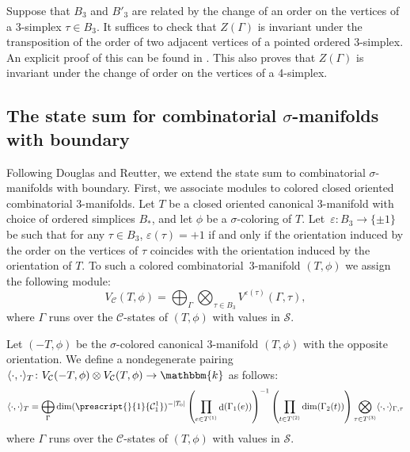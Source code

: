 \documentclass[a4paper, oneside]{amsart}
\DeclareMathOperator{\wdim}{d}
\numberwithin{equation}{subsection}
\theoremstyle{referencedlemma}
\theoremstyle{plain} %
\theoremstyle{remark}
\begin{document}
Suppose that $B_3$ and $B'_3$ are related by the change of an order on the vertices of a 3-simplex $\tau\in B_3$.  It suffices to check that $Z(\Gamma)$ is invariant under the transposition of the order of two adjacent vertices of a pointed ordered 3-simplex. An explicit proof of this can be found in \cite[Lemmas 4.2.4 and 4.2.5]{douglas_fusion_2018}. This also proves that $Z(\Gamma)$ is invariant under the change of order on the vertices of a 4-simplex. 


\subsection{The state sum for combinatorial $\sigma$-manifolds with boundary}\label{Section_State sum for manifolds with boundary} Following Douglas and Reutter, we extend the state sum to combinatorial $\sigma$-manifolds with boundary.   First, we associate modules to colored closed oriented combinatorial 3-manifolds. Let $T$ be a closed oriented canonical 3-manifold with choice of ordered simplices $B_*$, and let $\phi$ be a $\sigma$-coloring of $T$.  Let~$\varepsilon \colon
 B_3\to \{\pm 1\}$ be such that for any $\tau \in B_3$, $\varepsilon(\tau) = +1$ if and only if the orientation induced by the order on the vertices of $\tau$ coincides with the orientation induced by the orientation of $T$.  To such a colored combinatorial~3-manifold $(T, \phi)$ we assign the following module:
\begin{equation*}
V_\mathcal{C}(T, \phi) = \bigoplus_{\Gamma} \bigotimes_{\tau\in B_3} V^{\varepsilon(\tau)}(\Gamma, \tau),
\end{equation*}
where $\Gamma$ runs over the $\mathcal{C}$-states of $(T,\phi)$ with values in $\mathcal{S}$. 

Let $(-T,\phi)$ be the $\sigma$-colored canonical 3-manifold $(T,\phi)$ with the opposite orientation. We define a nondegenerate pairing $\langle \cdot, \cdot\rangle_T \colon V_\mathcal{C}(-T, \phi) \otimes V_\mathcal{C}(T,\phi) \to \mathbbm{k}$ as follows:
$$
\langle \cdot, \cdot \rangle_{T} = \bigoplus_{\Gamma} \dim(\prescript{}{1}{\mathcal{C}^1_1})^{-\lvert T_0\rvert} \left( \prod_{e\in T^{(1)}}\wdim(\Gamma_1(e))\right)^{-1} \left( \prod_{t\in T^{(2)}}\dim(\Gamma_2(t)) \right)\bigotimes_{\tau\in T^{(3)}}\langle \cdot, \cdot \rangle_{\Gamma, \tau}
$$
where $\Gamma$ runs over the $\mathcal{C}$-states of $(T, \phi)$ with values in $\mathcal{S}$. 
\end{document}
